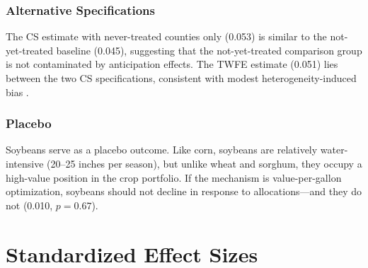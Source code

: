 \documentclass[12pt]{article}
\begin{document}
\subsubsection*{Alternative Specifications} The CS estimate with never-treated counties only (0.053) is similar to the not-yet-treated baseline (0.045), suggesting that the not-yet-treated comparison group is not contaminated by anticipation effects. The TWFE estimate (0.051) lies between the two CS specifications, consistent with modest heterogeneity-induced bias \citep{goodmanbacon2021difference}.

\subsubsection*{Placebo} Soybeans serve as a placebo outcome. Like corn, soybeans are relatively water-intensive (20--25 inches per season), but unlike wheat and sorghum, they occupy a high-value position in the crop portfolio. If the mechanism is value-per-gallon optimization, soybeans should not decline in response to allocations---and they do not (0.010, $p = 0.67$).


\section{Standardized Effect Sizes}
\label{sec:sde}


\end{document}
